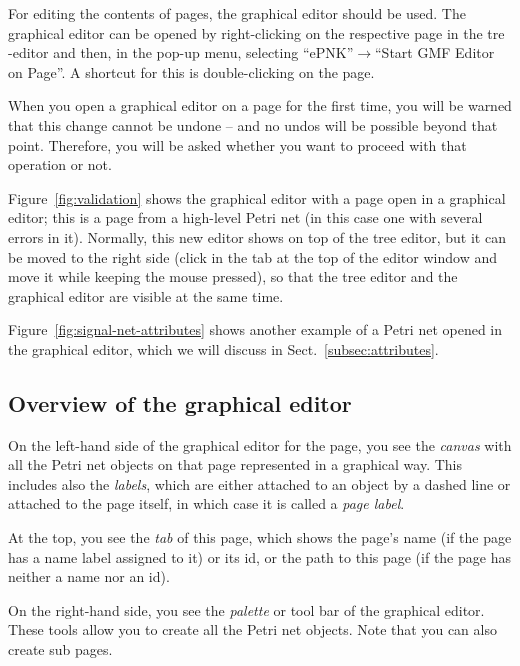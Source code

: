 
For editing the contents of pages, the graphical editor should be used. The
graphical editor can be opened by right-clicking on the respective page in the
tre -editor and then, in the pop-up menu, selecting ``ePNK''$\rightarrow$``Start
GMF Editor on Page''. A shortcut for this is double-clicking on the page.

When you open a graphical editor on a page for the first time, you will
be warned that this change cannot be undone -- and no undos will be
possible beyond that point. Therefore, you will be asked whether you
want to proceed with that operation or not. 

Figure~\ref{fig:validation} shows the graphical editor with a page
open in a graphical editor; this is a
page from a high-level Petri net (in this case one with several errors
in it). Normally, this new editor shows on top of the tree editor, but
it can be moved to the right side (click in the tab at the top of the
editor window and move it while keeping the mouse pressed), so that the
tree editor and the graphical editor are visible at the same time.

Figure~\ref{fig:signal-net-attributes} shows another example of a Petri net
opened in the graphical editor, which we will discuss in
Sect.~\ref{subsec:attributes}.

\subsection{Overview of the graphical editor}
\label{subsect:graphical-editor:overview}

On the left-hand side of the graphical editor for the page, you see the
\emph{canvas}%
with all the Petri net objects on that page represented
in a graphical way.  This includes also the \emph{labels},%
which are either attached to an object by a dashed line or attached to the page
itself, in which case it is called a \emph{page label}.%

At the top, you see the \emph{tab} of this page, which shows the page's
name (if the page has a name label assigned to it) or its id, or the
path to this page (if the page has neither a name nor an id).   

On the right-hand side, you see the \emph{palette}
or tool bar of the graphical editor. These tools allow you to create
all the Petri net objects.  Note that you can also create sub pages.

